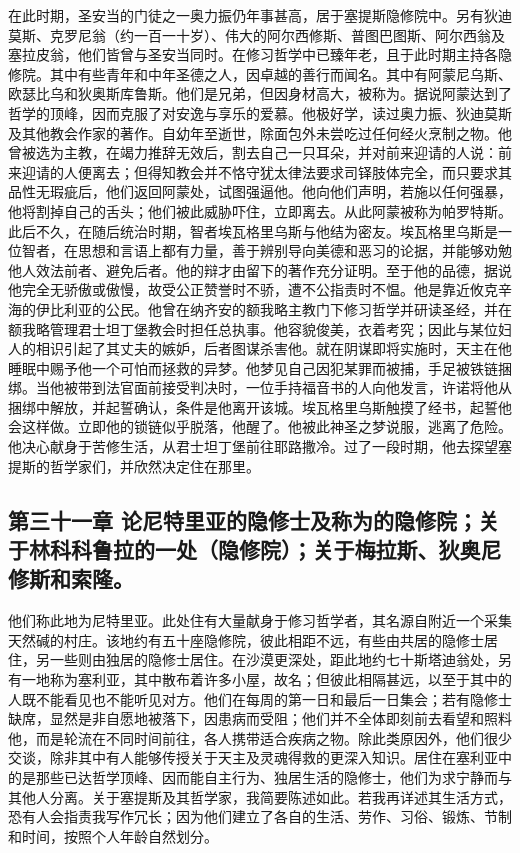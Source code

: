 在此时期，圣安当的门徒之一奥力振仍年事甚高，居于塞提斯隐修院中。另有狄迪莫斯、克罗尼翁（约一百一十岁）、伟大的阿尔西修斯、普图巴图斯、阿尔西翁及塞拉皮翁，他们皆曾与圣安当同时。在修习哲学中已臻年老，且于此时期主持各隐修院。其中有些青年和中年圣德之人，因卓越的善行而闻名。其中有阿蒙尼乌斯、欧瑟比乌和狄奥斯库鲁斯。他们是兄弟，但因身材高大，被称为。据说阿蒙达到了哲学的顶峰，因而克服了对安逸与享乐的爱慕。他极好学，读过奥力振、狄迪莫斯及其他教会作家的著作。自幼年至逝世，除面包外未尝吃过任何经火烹制之物。他曾被选为主教，在竭力推辞无效后，割去自己一只耳朵，并对前来迎请的人说：前来迎请的人便离去；但得知教会并不恪守犹太律法要求司铎肢体完全，而只要求其品性无瑕疵后，他们返回阿蒙处，试图强逼他。他向他们声明，若施以任何强暴，他将割掉自己的舌头；他们被此威胁吓住，立即离去。从此阿蒙被称为帕罗特斯。此后不久，在随后统治时期，智者埃瓦格里乌斯与他结为密友。埃瓦格里乌斯是一位智者，在思想和言语上都有力量，善于辨别导向美德和恶习的论据，并能够劝勉他人效法前者、避免后者。他的辩才由留下的著作充分证明。至于他的品德，据说他完全无骄傲或傲慢，故受公正赞誉时不骄，遭不公指责时不愠。他是靠近攸克辛海的伊比利亚的公民。他曾在纳齐安的额我略主教门下修习哲学并研读圣经，并在额我略管理君士坦丁堡教会时担任总执事。他容貌俊美，衣着考究；因此与某位妇人的相识引起了其丈夫的嫉妒，后者图谋杀害他。就在阴谋即将实施时，天主在他睡眠中赐予他一个可怕而拯救的异梦。他梦见自己因犯某罪而被捕，手足被铁链捆绑。当他被带到法官面前接受判决时，一位手持福音书的人向他发言，许诺将他从捆绑中解放，并起誓确认，条件是他离开该城。埃瓦格里乌斯触摸了经书，起誓他会这样做。立即他的锁链似乎脱落，他醒了。他被此神圣之梦说服，逃离了危险。他决心献身于苦修生活，从君士坦丁堡前往耶路撒冷。过了一段时期，他去探望塞提斯的哲学家们，并欣然决定住在那里。\par


\subsection{第三十一章 论尼特里亚的隐修士及称为的隐修院；关于林科科鲁拉的一处（隐修院）；关于梅拉斯、狄奥尼修斯和索隆。}

他们称此地为尼特里亚。此处住有大量献身于修习哲学者，其名源自附近一个采集天然碱的村庄。该地约有五十座隐修院，彼此相距不远，有些由共居的隐修士居住，另一些则由独居的隐修士居住。在沙漠更深处，距此地约七十斯塔迪翁处，另有一地称为塞利亚，其中散布着许多小屋，故名；但彼此相隔甚远，以至于其中的人既不能看见也不能听见对方。他们在每周的第一日和最后一日集会；若有隐修士缺席，显然是非自愿地被落下，因患病而受阻；他们并不全体即刻前去看望和照料他，而是轮流在不同时间前往，各人携带适合疾病之物。除此类原因外，他们很少交谈，除非其中有人能够传授关于天主及灵魂得救的更深入知识。居住在塞利亚中的是那些已达哲学顶峰、因而能自主行为、独居生活的隐修士，他们为求宁静而与其他人分离。关于塞提斯及其哲学家，我简要陈述如此。若我再详述其生活方式，恐有人会指责我写作冗长；因为他们建立了各自的生活、劳作、习俗、锻炼、节制和时间，按照个人年龄自然划分。\par

